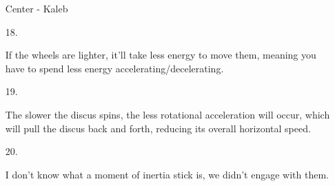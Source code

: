 \begin{itemize}
        Center - Kaleb

        \item [18.]
        
        If the wheels are lighter, it'll take less energy to move them, meaning you have to spend less energy accelerating/decelerating.

        \item [19.]
        
        The slower the discus spins, the less rotational acceleration will occur, which will pull the discus back and forth, reducing its overall horizontal speed.

        \item [20.]
        
        I don't know what a moment of inertia stick is, we didn't engage with them.

    \end{itemize}

